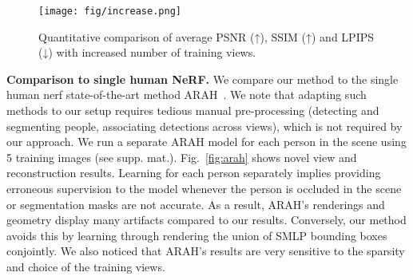 \begin{figure}[h!]
\vspace{-3mm}
\centering
\texttt{[image: fig/increase.png]}
\vspace{-2mm}

  \caption{Quantitative comparison of average PSNR (↑), SSIM (↑) and LPIPS (↓) with increased number of training views. }
  \label{fig:increase}
\end{figure}


\noindent
\textbf{Comparison to single human NeRF.} 
We compare our method to the single human nerf state-of-the-art method ARAH~\cite{wang2022arah}. We note that adapting such methods to our setup requires tedious manual pre-processing (detecting and segmenting people, associating detections across views), which is not required by our approach.
We run a separate ARAH model for each person in the scene using 5 training images (see supp. mat.). Fig.~\ref{fig:arah} shows novel view and reconstruction results. Learning for each person separately implies providing erroneous supervision to the model whenever the person is occluded in the scene or segmentation masks are not accurate. As a result, ARAH's renderings and geometry display many artifacts compared to our results.
Conversely, our method avoids this by learning through rendering the union of SMLP bounding boxes conjointly. We also noticed that ARAH's results are very sensitive to the sparsity and choice of the training views.


